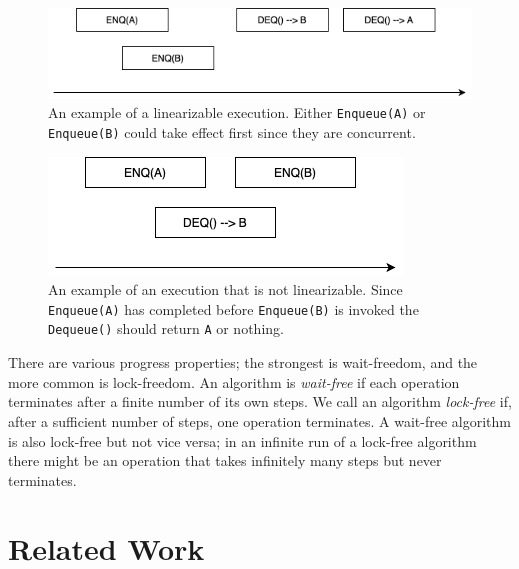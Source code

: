 \documentclass[12pt]{article}
\begin{document}
\begin{figure}[hbt]
  \center\includegraphics[scale=0.5]{pics/good}
  \caption{\label{fig::goodexample}An example of a linearizable execution. Either \texttt{Enqueue(A)} or \texttt{Enqueue(B)} could take effect first since they are concurrent.}
\end{figure}

\begin{figure}[hbt]
  \center\includegraphics[scale=0.5]{pics/bad}
  \caption{\label{fig::badexample}An example of an execution that is not linearizable. Since \texttt{Enqueue(A)} has completed before \texttt{Enqueue(B)} is invoked the \texttt{Dequeue()} should return \texttt{A} or nothing.}
\end{figure}


There are various progress properties; the strongest is wait-freedom, and the more common is lock-freedom. An algorithm is \textit{wait-free} if each operation terminates after a finite number of its own steps. We call an algorithm \textit{lock-free} if, after a sufficient number of steps, one operation terminates. A wait-free algorithm is also lock-free but not vice versa; in an infinite run of a lock-free algorithm there might be an operation that takes infinitely many steps but never terminates.


\section{Related Work}
\end{document}
